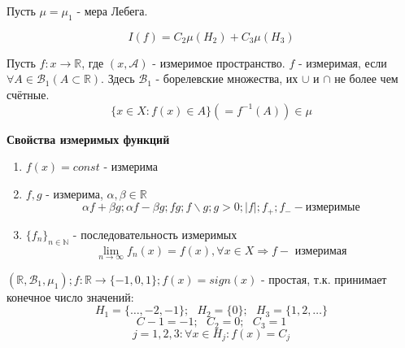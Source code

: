 \begin{exmp}
	Пусть $\mu = \mu_1$ - мера Лебега.
	\begin{figure}[H]
	\end{figure}
	\[ I(f) = C_2 \mu (H_2) + C_3 \mu (H_3) \]
\end{exmp}

\begin{definition}
	Пусть $f: x \to \mathbb{R}$, где $(x, \mathcal{A})$ - измеримое пространство. $f$ - измеримая, если $\forall A \in \mathcal{B}_1 (A \subset \mathbb{R})$. Здесь $\mathcal{B}_1$ - борелевские множества, их $\cup$ и $\cap$ не более чем счётные.
	\[ \{ x\in X: f(x) \in A \} (= f^{-1} (A)) \in \mu \]
\end{definition}

\textbf{Свойства измеримых функций}
\begin{enumerate}
	\item $f(x) = const$ - измерима
	\item $f,g$ - измерима, $\alpha, \beta \in \mathbb{R}$
	\[ \alpha f + \beta g; \alpha f - \beta g; fg; f \backslash g; g > 0; |f|; f_{+}; f_{-} - \text{измеримые} \]
	\item $\{ f_n \}_{n \in \mathbb{N}}$ - последовательность измеримых
	\[ \lim_{n \to \infty} f_n (x) = f(x), \forall x \in X \Rightarrow f - \text{ измеримая} \]
\end{enumerate}

\begin{exmp}
	$(\mathbb{R}, \mathcal{B}_1, \mu_1); f : \mathbb{R} \to \{ -1, 0, 1 \}; f(x) = sign (x)$ - простая, т.к. принимает конечное число значений:
	\[ H_1 = \{ \dots, -2, -1 \}; ~~~ H_2 = \{ 0 \}; ~~~ H_3 = \{ 1, 2, \dots \} \]
	\[ C-1 = -1; ~~~ C_2 = 0; ~~~ C_3 = 1 \]
	\[ j = 1,2,3 : \forall x \in H_j : f(x) = C_j \]
\end{exmp}

